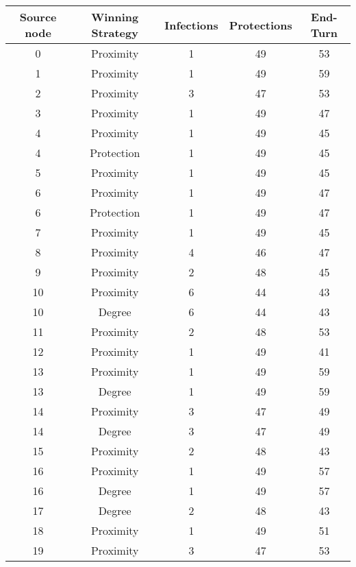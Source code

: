 \documentclass[results.tex]{subfiles}
\begin{document}
\begin{center}
  \begin{tabular}{| c || c | c | c | c |}
    \hline
    {\bfseries Source node} & {\bfseries Winning Strategy} & {\bfseries Infections} & {\bfseries Protections} & {\bfseries End-Turn} \\  %
    \hline\hline
    0 & Proximity & 1 & 49 & 53 \\ 
    \hline
    1 & Proximity & 1 & 49 & 59 \\ 
    \hline
    2 & Proximity & 3 & 47 & 53 \\ 
    \hline
    3 & Proximity & 1 & 49 & 47 \\ 
    \hline
    4 & Proximity & 1 & 49 & 45 \\ 
    \hline
    4 & Protection & 1 & 49 & 45 \\ 
    \hline
    5 & Proximity & 1 & 49 & 45 \\ 
    \hline
    6 & Proximity & 1 & 49 & 47 \\ 
    \hline
    6 & Protection & 1 & 49 & 47 \\ 
    \hline
    7 & Proximity & 1 & 49 & 45 \\ 
    \hline
    8 & Proximity & 4 & 46 & 47 \\ 
    \hline
    9 & Proximity & 2 & 48 & 45 \\ 
    \hline
    10 & Proximity & 6 & 44 & 43 \\ 
    \hline
    10 & Degree & 6 & 44 & 43 \\ 
    \hline
    11 & Proximity & 2 & 48 & 53 \\ 
    \hline
    12 & Proximity & 1 & 49 & 41 \\ 
    \hline
    13 & Proximity & 1 & 49 & 59 \\ 
    \hline
    13 & Degree & 1 & 49 & 59 \\ 
    \hline
    14 & Proximity & 3 & 47 & 49 \\ 
    \hline
    14 & Degree & 3 & 47 & 49 \\ 
    \hline
    15 & Proximity & 2 & 48 & 43 \\ 
    \hline
    16 & Proximity & 1 & 49 & 57 \\ 
    \hline
    16 & Degree & 1 & 49 & 57 \\ 
    \hline
    17 & Degree & 2 & 48 & 43 \\ 
    \hline
    18 & Proximity & 1 & 49 & 51 \\ 
    \hline
    19 & Proximity & 3 & 47 & 53 \\ 

\end{tabular}
\end{center}
\end{document}
